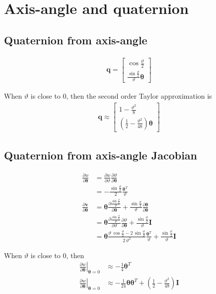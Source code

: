 \documentclass{article}
\renewcommand\aa{\bm{\theta}}
\renewcommand\t{\vartheta}
\newcommand\q{\bm{q}}
\newcommand\I{\bm{I}}
\renewcommand\v{\bm{v}}
\begin{document}
\section{Axis-angle and quaternion}
\subsection{Quaternion from axis-angle}
\begin{align}
  \q = 
    \begin{bmatrix} 
       \cos{ \frac{\t}{2} } \\[5pt]
       \frac{\sin{ \frac{\t}{2} }}{\t} \aa
    \end{bmatrix}
\end{align}

When $\t$ is close to $0$, then the second order Taylor approximation is
\begin{align}
  \q \approx
    \begin{bmatrix} 
      1 - \frac{\t^2}{8} \\[5pt]
      \left( \frac{1}{2} - \frac{\t^2}{48} \right) \aa
    \end{bmatrix}
\end{align}

\subsection{Quaternion from axis-angle Jacobian}
\begin{align}
  \frac{\partial w}{\partial \aa} 
  &=  \frac{\partial w}{\partial \t} \frac{\partial \t}{\partial \aa}  \\
  &=-\frac{\sin{\frac{\t}{2}}}{2} \frac{\aa^T}{\t}  \\
     \frac{\partial \v}{\partial \aa} &= 
  \aa \frac{\partial \frac{\sin{ \frac{\t}{2} }}{\t}}{\partial \aa} + 
  \frac{\sin{ \frac{\t}{2} }}{\t} \frac{\partial \aa}{\partial \aa}\\
  &= \aa \frac{\partial \frac{\sin{ \frac{\t}{2} }}{\t}}{\partial \t} \frac{\partial \t}{\partial \aa}  + 
  \frac{\sin{ \frac{\t}{2} }}{\t} \I \\
  &= 
     \aa \frac{\t \, \cos{\frac{\t}{2}} - 2\,\sin{\frac{\t}{2}}}{2\,\t^2} \frac{\aa^T}{\t}
    + \frac{\sin{\frac{\t}{2}}}{\t} \I
\end{align}

When $\t$ is close to $0$, then
\begin{align}
  \left. \frac{\partial w}{\partial \aa} \right \vert_{\aa = 0} &\approx - \frac{1}{4} \aa^T \\
  \left. \frac{\partial w}{\partial \aa} \right \vert_{\aa = 0} &\approx - \frac{1}{24} \aa \aa^T + \left(\frac{1}{2} - \frac{\t^2}{48} \right) \I
\end{align}
\end{document}
